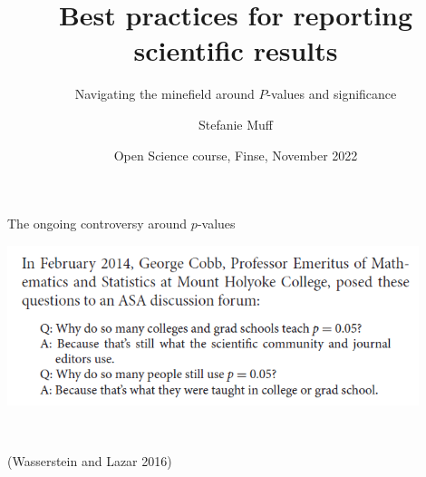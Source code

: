 \documentclass[
  10pt,
  ignorenonframetext,
]{beamer}
\title{Best practices for reporting scientific results}
\subtitle{Navigating the minefield around \(P\)-values and significance}
\author{Stefanie Muff}
\date{Open Science course, Finse, November 2022}
\begin{document}
\frame{\titlepage}

\begin{frame}
\begin{block}{The ongoing controversy around \(p\)-values}
\protect\hypertarget{the-ongoing-controversy-around-p-values}{}
\(~\)

\centering

\includegraphics[width=0.9\textwidth,height=\textheight]{graphics/pvalue_circle.png}

\(~\)

\flushleft
\scriptsize

(Wasserstein and Lazar 2016)
\end{block}
\end{frame}
\end{document}

